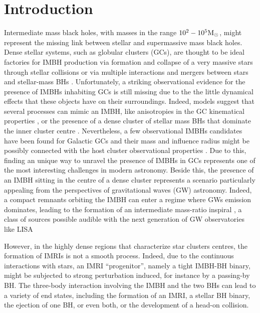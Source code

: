 \documentclass[twocolumn]{aastex62}
\newcommand{\Ms}{{\rm M}_\odot}
\begin{document}


\section{Introduction}

Intermediate mass black holes, with masses in the range $10^2-10^5\Ms$, might
represent the missing link between stellar and supermassive mass black holes.
Dense stellar systems, such as globular clusters (GCs), are thought to be ideal
factories for IMBH production via formation and collapse of a very massive
stars through stellar collisions \citep{zwart02, giersz15, mapelli16} or via
multiple interactions and mergers between stars and stellar-mass BHs
\citep{giersz15}. Unfortunately, a striking observational evidence for the
presence of IMBHs inhabiting GCs is still missing due to the the little
dynamical effects that these objects have on their surroundings. Indeed, models
suggest that several processes can mimic an IMBH, like anisotropies in the GC
kinematical properties \citep{zocchi}, or the presence of a dense cluster of
stellar mass BHs that dominate the inner cluster centre
\citep{AAG18a,AAG18b,AS16,vandermarel10}. Nevertheless, a few observational
IMBHs candidates have been found for Galactic GCs
\citep{noyola10,lu13,lanzoni13,kiziltan17} and their mass and influence radius
might be possibly connected with the host cluster observational properties
\citep{AAG18a}. Due to this, finding an unique way to unravel the presence of
IMBHs in GCs represents one of the most interesting challenges in modern
astronomy. Beside this, the presence of an IMBH sitting in the centre of a
dense cluster represents a scenario particularly appealing from the
perspectives of gravitational waves (GW) astronomy. Indeed, a compact remnants
orbiting the IMBH can enter a regime where GWs emission dominates, leading to
the formation of an intermediate mass-ratio inspiral
\citep[IMRI,][]{konstantinidis13,haster16,leigh14}, a class of sources possible
audible with the next generation of GW observatories like LISA
\citep{seoane07,amaro12,seoane18}

However, in the highly dense regions that characterize star clusters centres,
the formation of IMRIs is not a smooth process. Indeed, due to the continuous
interactions with stars, an IMRI ``progenitor'', namely a tight IMBH-BH binary,
might be subjected to strong perturbation induced, for instance by a passing-by
BH. The three-body interaction involving the IMBH and the two BHs can lead to a
variety of end states, including the formation of an IMRI, a stellar BH binary,
the ejection of one BH, or even both, or the development of a head-on
collision. 
\end{document}
